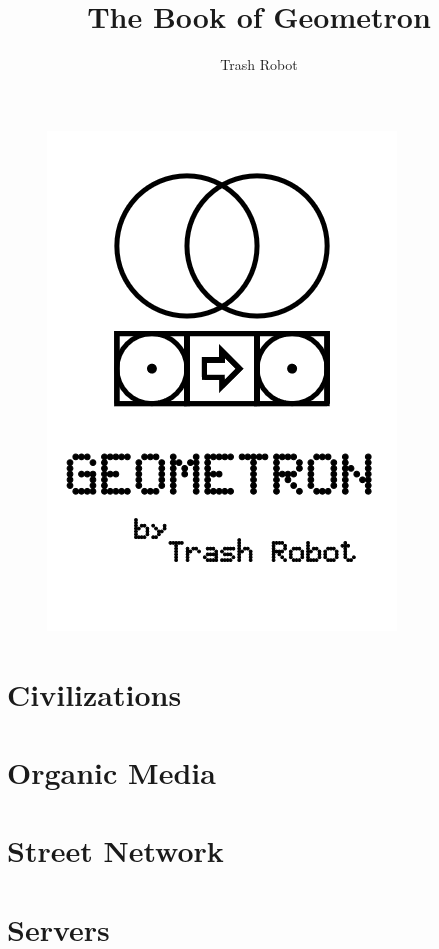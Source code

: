 \documentclass{report}
\title{The Book of Geometron}
\author{Trash Robot}
\begin{document}
\frontmatter
\begin{figure}[htbp]
\centering
\includegraphics{cover.png}
\end{figure}

\clearpage

\clearpage

\thispagestyle{empty}
\mbox{}

\maketitle


%

\mainmatter

\chapter{Civilizations}

\chapter{Organic Media}

\chapter{Street Network}

\chapter{Servers}

\end{document}
